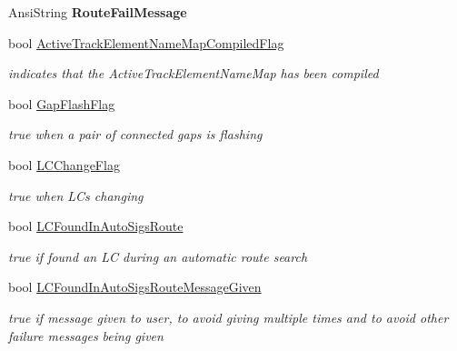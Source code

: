 \begin{DoxyCompactItemize}
Ansi\+String {\bfseries Route\+Fail\+Message}
\item 
\mbox{\label{class_t_track_ab31047fd6669faab13b15647b798bf1f}} 
bool \mbox{\hyperlink{class_t_track_ab31047fd6669faab13b15647b798bf1f}{Active\+Track\+Element\+Name\+Map\+Compiled\+Flag}}
\begin{DoxyCompactList}\small\item\em indicates that the Active\+Track\+Element\+Name\+Map has been compiled \end{DoxyCompactList}\item 
\mbox{\label{class_t_track_a647fc3b77cb297f9ed22fb2134969518}} 
bool \mbox{\hyperlink{class_t_track_a647fc3b77cb297f9ed22fb2134969518}{Gap\+Flash\+Flag}}
\begin{DoxyCompactList}\small\item\em true when a pair of connected gaps is flashing \end{DoxyCompactList}\item 
\mbox{\label{class_t_track_a95e861b6cc171e005cd3b6e1ce5b011d}} 
bool \mbox{\hyperlink{class_t_track_a95e861b6cc171e005cd3b6e1ce5b011d}{L\+C\+Change\+Flag}}
\begin{DoxyCompactList}\small\item\em true when L\+Cs changing \end{DoxyCompactList}\item 
\mbox{\label{class_t_track_a7d42332d3b0b4122ea7b8f3c6332ee97}} 
bool \mbox{\hyperlink{class_t_track_a7d42332d3b0b4122ea7b8f3c6332ee97}{L\+C\+Found\+In\+Auto\+Sigs\+Route}}
\begin{DoxyCompactList}\small\item\em true if found an LC during an automatic route search \end{DoxyCompactList}\item 
\mbox{\label{class_t_track_a5d8fb05b298ffb88648aa1993cf4ac2c}} 
bool \mbox{\hyperlink{class_t_track_a5d8fb05b298ffb88648aa1993cf4ac2c}{L\+C\+Found\+In\+Auto\+Sigs\+Route\+Message\+Given}}
\begin{DoxyCompactList}\small\item\em true if message given to user, to avoid giving multiple times and to avoid other failure messages being given \end{DoxyCompactList}\item 

\end{DoxyCompactItemize}
